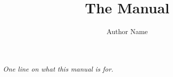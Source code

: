 \documentclass{tufte-book}
\title{The \project Manual}
\author{Author Name}
\begin{document}
\maketitle

\newpage\thispagestyle{empty}
\begin{fullwidth}
  \vspace*{2cm}\centering
  \brandmark[6cm]\par\vskip1cm
  {\large\brandwordmark}\par\vskip0.5cm
  {\itshape One line on what this manual is for.}
\end{fullwidth}

\tableofcontents





\end{document}

